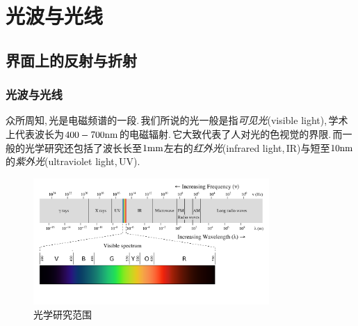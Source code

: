 \chapter{光波与光线}

\section{界面上的反射与折射}

\subsection{光波与光线}

众所周知,\,光是电磁频谱的一段.\,我们所说的光一般是指\emph{可见光}(visible light),\,学术上代表波长为$400-700{\rm nm}$的电磁辐射.\,它大致代表了人对光的色视觉的界限.\,而一般的光学研究还包括了波长长至$1{\rm mm}$左右的\emph{红外光}(infrared light,\,IR)与短至$10{\rm nm}$的\emph{紫外光}(ultraviolet light,\,UV).
\begin{figure}[H]
\centering
\includegraphics[width=0.8\textwidth]{image/5-6-1.png}
\caption{光学研究范围}
\end{figure}

